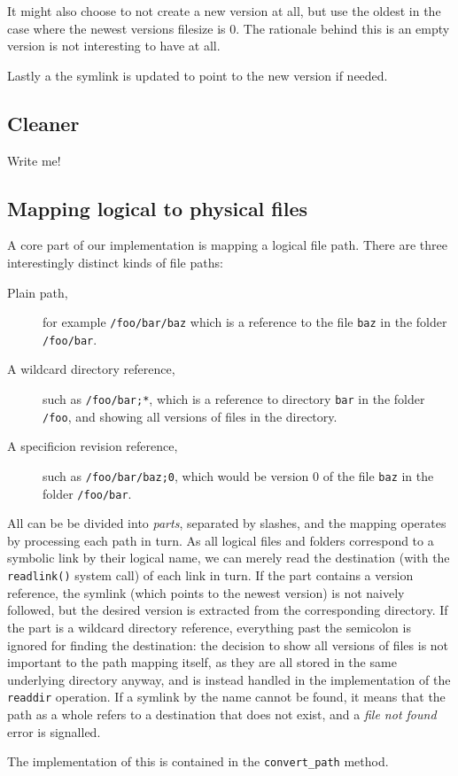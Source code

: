 \documentclass[12pt]{article}
\begin{document}
It might also choose to not create a new version at all, but use the
oldest in the case where the newest versions filesize is 0. The
rationale behind this is an empty version is not interesting to have
at all.

Lastly a the symlink is updated to point to the new version if needed.

\subsection{Cleaner}
Write me!

\subsection{Mapping logical to physical files}

A core part of our implementation is mapping a logical file path.
There are three interestingly distinct kinds of file paths:

\begin{description}
\item[Plain path,] for example \texttt{/foo/bar/baz} which is a
  reference to the file \texttt{baz} in the folder \texttt{/foo/bar}.
\item[A wildcard directory reference,] such as \texttt{/foo/bar;*},
  which is a reference to directory \texttt{bar} in the folder
  \texttt{/foo}, and showing all versions of files in the directory.
\item[A specificion revision reference,] such as
  \texttt{/foo/bar/baz;0}, which would be version $0$ of the file
  \texttt{baz} in the folder \texttt{/foo/bar}.
\end{description}

All can be be divided into \textit{parts}, separated by slashes, and
the mapping operates by processing each path in turn.  As all logical
files and folders correspond to a symbolic link by their logical name,
we can merely read the destination (with the \texttt{readlink()}
system call) of each link in turn.  If the part contains a version
reference, the symlink (which points to the newest version) is not
naively followed, but the desired version is extracted from the
corresponding directory.  If the part is a wildcard directory
reference, everything past the semicolon is ignored for finding the
destination: the decision to show all versions of files is not
important to the path mapping itself, as they are all stored in the
same underlying directory anyway, and is instead handled in the
implementation of the \texttt{readdir} operation. If a symlink by the
name cannot be found, it means that the path as a whole refers to a
destination that does not exist, and a \textit{file not found} error
is signalled.

The implementation of this is contained in the \texttt{convert\_path}
method.
\end{document}
